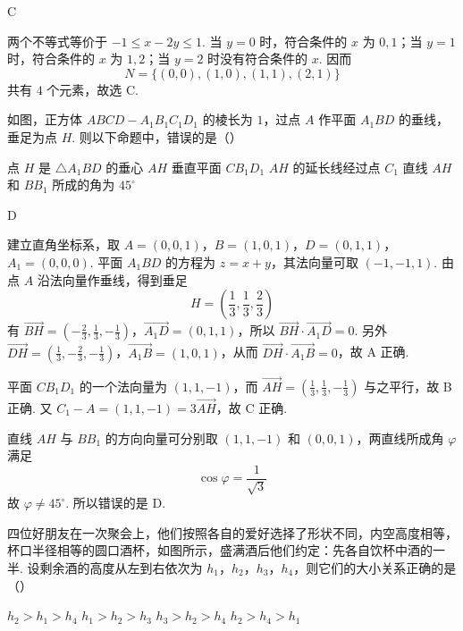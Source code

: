 \begin{answer}
C
\end{answer}

\begin{solution}
两个不等式等价于 \(-1\leqslant x-2y\leqslant1\). 当 \(y=0\) 时，符合条件的 \(x\) 为 \(0,1\)；当 \(y=1\) 时，符合条件的 \(x\) 为 \(1,2\)；当 \(y=2\) 时没有符合条件的 \(x\). 因而
\[
N=\{(0,0),(1,0),(1,1),(2,1)\}
\]
共有 \(4\) 个元素，故选 C.
\end{solution}

\begin{problem}
如图，正方体 \(ABCD - A_{1}B_{1}C_{1}D_{1}\) 的棱长为 \(1\)，过点 \(A\) 作平面 \(A_{1}BD\) 的垂线，垂足为点 \(H\). 则以下命题中，错误的是（\quad）


\choices
    {点 \(H\) 是 \(\triangle A_{1}BD\) 的垂心}
    {\(AH\) 垂直平面 \(CB_{1}D_{1}\)}
    {\(AH\) 的延长线经过点 \(C_{1}\)}
    {直线 \(AH\) 和 \(BB_{1}\) 所成的角为 \(45^{\circ}\)}
\end{problem}

\begin{answer}
D
\end{answer}

\begin{solution}
建立直角坐标系，取
\(A=(0,0,1)\)，\(B=(1,0,1)\)，\(D=(0,1,1)\)，\(A_1=(0,0,0)\).
平面 \(A_1BD\) 的方程为 \(z=x+y\)，其法向量可取 \((-1,-1,1)\). 由点 \(A\) 沿法向量作垂线，得到垂足
\[
H=\left(\frac13,\frac13,\frac23\right)
\]
有 \(\overrightarrow{BH}=\left(-\frac23,\frac13,-\frac13\right)\)，\(\overrightarrow{A_1D}=(0,1,1)\)，所以 \(\overrightarrow{BH}\cdot\overrightarrow{A_1D}=0\). 另外 \(\overrightarrow{DH}=\left(\frac13,-\frac23,-\frac13\right)\)，\(\overrightarrow{A_1B}=(1,0,1)\)，从而 \(\overrightarrow{DH}\cdot\overrightarrow{A_1B}=0\)，故 A 正确.

平面 \(CB_1D_1\) 的一个法向量为 \((1,1,-1)\)，而 \(\overrightarrow{AH}=\left(\frac13,\frac13,-\frac13\right)\) 与之平行，故 B 正确. 又 \(C_1-A=(1,1,-1)=3\overrightarrow{AH}\)，故 C 正确.

直线 \(AH\) 与 \(BB_1\) 的方向向量可分别取 \((1,1,-1)\) 和 \((0,0,1)\)，两直线所成角 \(\varphi\) 满足
\[
\cos\varphi=\frac{1}{\sqrt3}
\]
故 \(\varphi\ne45^{\circ}\). 所以错误的是 D.
\end{solution}

\begin{problem}
四位好朋友在一次聚会上，他们按照各自的爱好选择了形状不同，内空高度相等，杯口半径相等的圆口酒杯，如图所示，盛满酒后他们约定：先各自饮杯中酒的一半. 设剩余酒的高度从左到右依次为 \(h_1\)，\(h_2\)，\(h_3\)，\(h_4\)，则它们的大小关系正确的是（\quad）


\choices
    {\(h_2 > h_1 > h_4\)}
    {\(h_1 > h_2 > h_3\)}
    {\(h_3 > h_2 > h_4\)}
    {\(h_2 > h_4 > h_1\)}
\end{problem}

